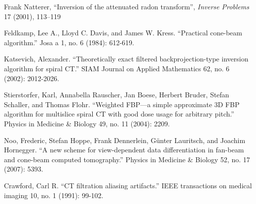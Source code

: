 \documentclass[11pt]{article}
\begin{document}
\begin{thebibliography}{100}
 Frank Natterer, ``Inversion of the attenuated radon transform'', \emph{Inverse Problems} 17 (2001), 113–119

 Feldkamp, Lee A., Lloyd C. Davis, and James W. Kress. ``Practical cone-beam algorithm.'' Josa a 1, no. 6 (1984): 612-619.

 Katsevich, Alexander. ``Theoretically exact filtered backprojection-type inversion algorithm for spiral CT.'' SIAM Journal on Applied Mathematics 62, no. 6 (2002): 2012-2026.

 Stierstorfer, Karl, Annabella Rauscher, Jan Boese, Herbert Bruder, Stefan Schaller, and Thomas Flohr. ``Weighted FBP—a simple approximate 3D FBP algorithm for multislice spiral CT with good dose usage for arbitrary pitch.'' Physics in Medicine \& Biology 49, no. 11 (2004): 2209.

 Noo, Frederic, Stefan Hoppe, Frank Dennerlein, Günter Lauritsch, and Joachim Hornegger. ``A new scheme for view-dependent data differentiation in fan-beam and cone-beam computed tomography.'' Physics in Medicine \& Biology 52, no. 17 (2007): 5393.

 Crawford, Carl R. ``CT filtration aliasing artifacts.'' IEEE transactions on medical imaging 10, no. 1 (1991): 99-102.

\end{thebibliography}
\end{document}
